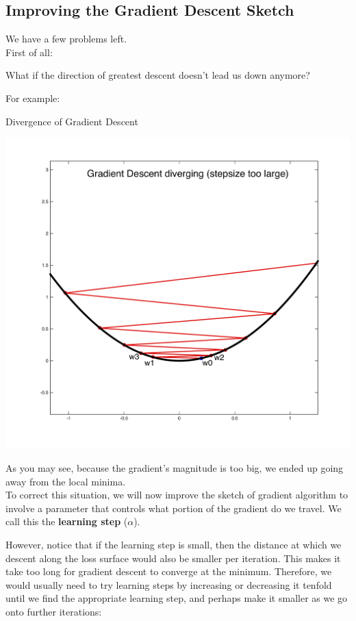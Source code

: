 \subsection{Improving the Gradient Descent Sketch}
We have a few problems left. \\
First of all:
\begin{center}
    What if the direction of greatest descent doesn't lead us down anymore?
\end{center}
For example:
\begin{ln-fig}[sidebyside]{Divergence of Gradient Descent}{}
    \begin{center}
        \includegraphics[scale=0.3]{figs/ln04/grad-descent-diverge.png}
    \end{center}
    \tcblower
    As you may see, because the gradient's magnitude is too big, we ended up going away from the local minima. \\
    To correct this situation, we will now improve the sketch of gradient algorithm to involve a parameter that controls what portion of the gradient do we travel. We call this the \textbf{learning step} ($\alpha$).
\end{ln-fig}
However, notice that if the learning step is small, then the distance at which we descent along the loss surface would also be smaller per iteration. This makes it take too long for gradient descent to converge at the minimum. 
Therefore, we would usually need to try learning steps by increasing or decreasing it tenfold until we find the appropriate learning step, and perhaps make it smaller as we go onto further iterations:
